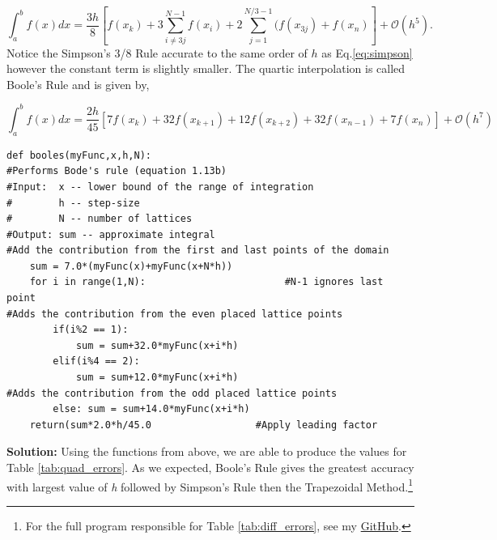 \documentclass[10pt]{article}
\begin{document}
\begin{equation}
	\label{eq:simpson3/8}
	\int^b_a f(x)dx = \frac{3h}{8}[f(x_k)+3\sum^{N-1}_{i\neq 3j} f(x_i) + 2\sum^{N/3-1}_{j=1} (f(x_{3j})+f(x_n)] + \mathcal{O}(h^5).
\end{equation}
Notice the Simpson's 3/8 Rule accurate to the same order of $h$ as Eq.\ref{eq:simpson} however the constant term is slightly smaller. The quartic interpolation is called Boole's Rule and is given by,

\begin{equation}
	\label{eq:boole}
	\int^b_a f(x)dx = \frac{2h}{45}[ 7f(x_k)+32f(x_{k+1})+12f(x_{k+2})+32f(x_{n-1})+7f(x_n)] + \mathcal{O}(h^7)
\end{equation}

\begin{lstlisting}
def booles(myFunc,x,h,N):
#Performs Bode's rule (equation 1.13b)
#Input:  x -- lower bound of the range of integration
#        h -- step-size
#        N -- number of lattices
#Output: sum -- approximate integral
#Add the contribution from the first and last points of the domain
    sum = 7.0*(myFunc(x)+myFunc(x+N*h))
    for i in range(1,N):                        #N-1 ignores last point
#Adds the contribution from the even placed lattice points
        if(i%2 == 1):
            sum = sum+32.0*myFunc(x+i*h)
        elif(i%4 == 2):
            sum = sum+12.0*myFunc(x+i*h)
#Adds the contribution from the odd placed lattice points
        else: sum = sum+14.0*myFunc(x+i*h)
    return(sum*2.0*h/45.0                  #Apply leading factor
\end{lstlisting}
\label{solution:1.2}\textbf{Solution:}
Using the functions from above, we are able to produce the values for Table \ref{tab:quad_errors}. As we expected, Boole's Rule gives the greatest accuracy with largest value of \textit{h} followed by Simpson's Rule then the Trapezoidal Method.\footnote{For the full program responsible for Table \ref{tab:diff_errors}, see my \href{https://github.com/jmelahman/computational-physics-solutions/blob/master/exercises_python/Chapter\%201/exercise1_2.py}{GitHub}.}
\end{document}
